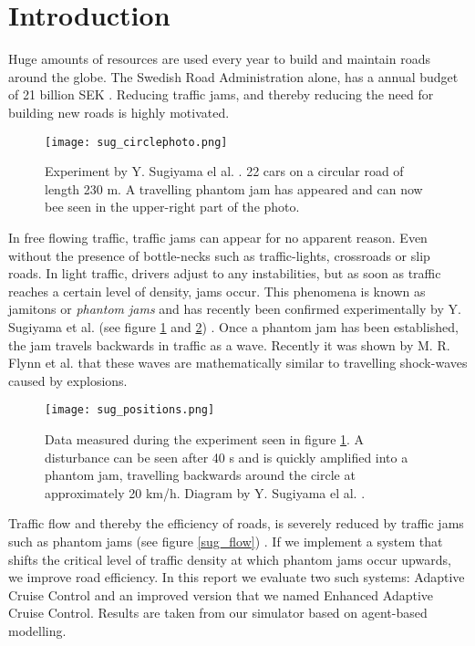 \section{Introduction}

Huge amounts of resources are used every year to build and maintain roads
around the globe. The Swedish Road Administration alone, has a annual budget
of 21 billion SEK \cite{vagverket}. Reducing traffic jams, and thereby
reducing the need for building new roads is highly motivated.

\begin{figure}[H]
    \begin{center}
    \texttt{[image: sug\_circlephoto.png]}
    \caption{\label{sug_photo}
Experiment by Y. Sugiyama el al. \cite{sugiyama}. 22 cars on a circular road
of length 230 m. A travelling phantom jam has appeared and can now bee seen in
the upper-right part of the photo.
} \end{center} \end{figure}

In free flowing traffic, traffic jams can appear for no apparent reason. Even
without the presence of bottle-necks such as traffic-lights, crossroads or
slip roads. In light traffic, drivers adjust to any
instabilities, but as soon as traffic reaches a certain level of density, jams
occur. This phenomena is known as jamitons or \emph{phantom jams} and has
recently been confirmed experimentally by Y. Sugiyama et al. (see figure
\ref{sug_photo} and \ref{sug_positions}) \cite{sugiyama}. Once a phantom jam has been
established, the jam travels backwards in traffic as a wave. Recently it was
shown by M. R. Flynn et al. \cite{mit} that these waves are mathematically
similar to travelling shock-waves caused by explosions.

\begin{figure}[H]
    \begin{center}
    \texttt{[image: sug\_positions.png]}
    \caption{\label{sug_positions}
Data measured during the experiment seen in figure \ref{sug_photo}. A disturbance
can be seen after 40 s and is quickly amplified into a phantom jam, travelling
backwards around the circle at approximately 20 km/h.
Diagram by Y. Sugiyama el al. \cite{sugiyama}.}
\end{center} \end{figure}

Traffic flow and thereby the efficiency of roads, is severely reduced by
traffic jams such as phantom jams (see figure \ref{sug_flow}) \cite{sugiyama}. If we implement a system that shifts the critical level of traffic density at which phantom jams occur upwards, we improve road efficiency. In this report we evaluate two such systems: Adaptive Cruise Control and an improved version that we named Enhanced Adaptive Cruise Control. Results are taken from our simulator based on agent-based modelling.

